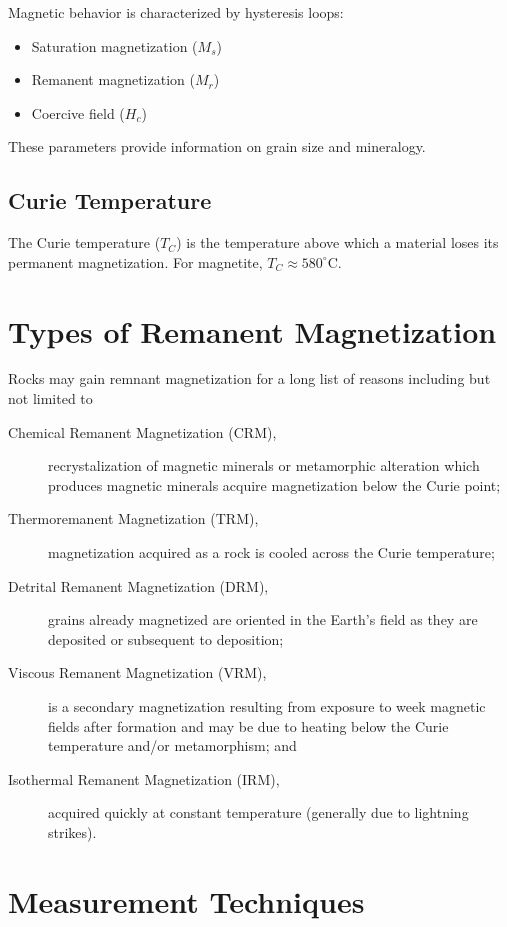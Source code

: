 Magnetic behavior is characterized by hysteresis loops:
\begin{itemize}
\item Saturation magnetization ($M_s$)
\item Remanent magnetization ($M_r$)
\item Coercive field ($H_c$)
\end{itemize}

These parameters provide information on grain size and mineralogy.

\subsection{Curie Temperature}

The Curie temperature ($T_C$) is the temperature above which a material loses its permanent magnetization. For magnetite, $T_C \approx 580^\circ$C.

\section{Types of Remanent Magnetization}

Rocks may gain remnant magnetization for a long list of reasons including but not limited to
\begin{description}
    \item[Chemical Remanent Magnetization (CRM),] recrystalization of magnetic minerals or metamorphic alteration which produces magnetic minerals acquire magnetization below the Curie point; 
    \item[Thermoremanent Magnetization (TRM),] magnetization acquired as a rock is cooled across the Curie temperature;
    \item[Detrital Remanent Magnetization (DRM),] grains already magnetized are oriented in the Earth's field as they are deposited or subsequent to deposition;
    \item[Viscous Remanent Magnetization (VRM),] is a secondary magnetization resulting from exposure to week magnetic fields after formation and may be due to heating below the Curie temperature and/or metamorphism; and
    \item[Isothermal Remanent Magnetization (IRM),] acquired quickly at constant temperature (generally due to lightning strikes).
\end{description}

\section{Measurement Techniques}


